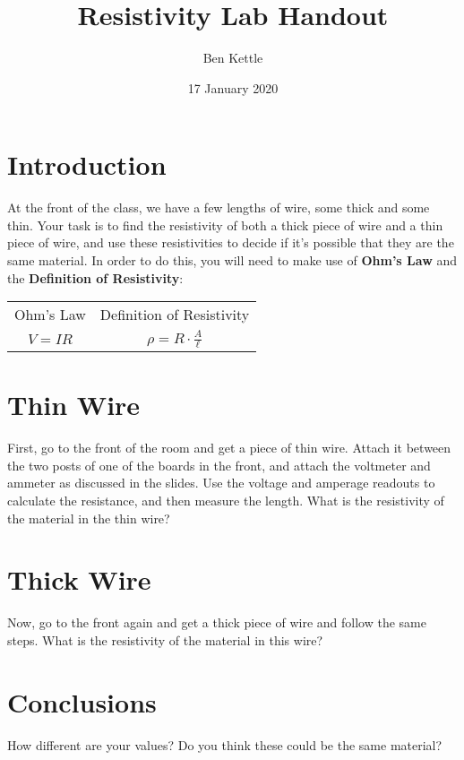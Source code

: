 \documentclass[a4paper]{article}
\title{Resistivity Lab Handout}
\author{Ben Kettle}
\date{17 January 2020}
\begin{document}
\maketitle

\section{Introduction}
At the front of the class, we have a few lengths of wire, some thick and some thin. Your task is to find the resistivity of both a thick piece of wire and a thin piece of wire, and use these resistivities to decide if it's possible that they are the same material. In order to do this, you will need to make use of \textbf{Ohm's Law} and the \textbf{Definition of Resistivity}:

\begin{center}
    \begin{tabular}{cc}
    Ohm's Law & Definition of Resistivity \\
    $V = IR$ & $\rho = R\cdot \frac{A}{\ell}$ \\
    \end{tabular}
\end{center}

\section{Thin Wire}
First, go to the front of the room and get a piece of thin wire. Attach it between the two posts of one of the boards in the front, and attach the voltmeter and ammeter as discussed in the slides. Use the voltage and amperage readouts to calculate the resistance, and then measure the length. What is the resistivity of the material in the thin wire?
\vspace{25mm}

\section{Thick Wire}
Now, go to the front again and get a thick piece of wire and follow the same steps. What is the resistivity of the material in this wire?
\vspace{25mm}

\section{Conclusions}
How different are your values? Do you think these could be the same material?
\end{document}
